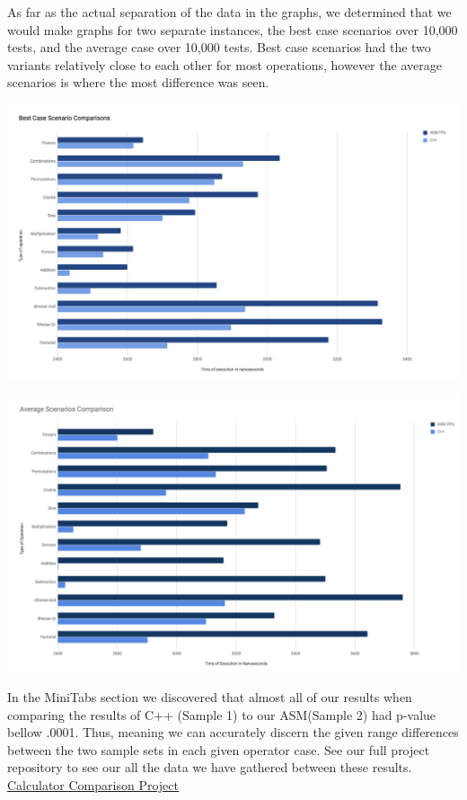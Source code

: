 \documentclass[a4paper,10pt]{article}
\begin{document}
\smallskip
As far as the actual separation of the data in the graphs, we determined that we would make graphs for two separate instances, the best case scenarios over 10,000 tests, and the average case over 10,000 tests. Best case scenarios had the two variants relatively close to each other for most operations, however the average scenarios is where the most difference was seen.

\smallskip
\hfill\includegraphics[width=190mm]{images/Best Case Scenario.png}\hspace*{\fill}

\hfill\includegraphics[width=190mm]{images/Average Best Case.png}\hspace*{\fill}

In the MiniTabs section we discovered that almost all of our results when comparing the results of C++ (Sample 1) to our ASM(Sample 2) had p-value bellow .0001. Thus, meaning we can accurately discern the given range differences between the two sample sets in each given operator case. See our full project repository to see our all the data we have gathered between these results. 
\href{https://github.com/EricCacciavillani/Calculator_Comparison}{Calculator Comparison Project}
\end{document}
